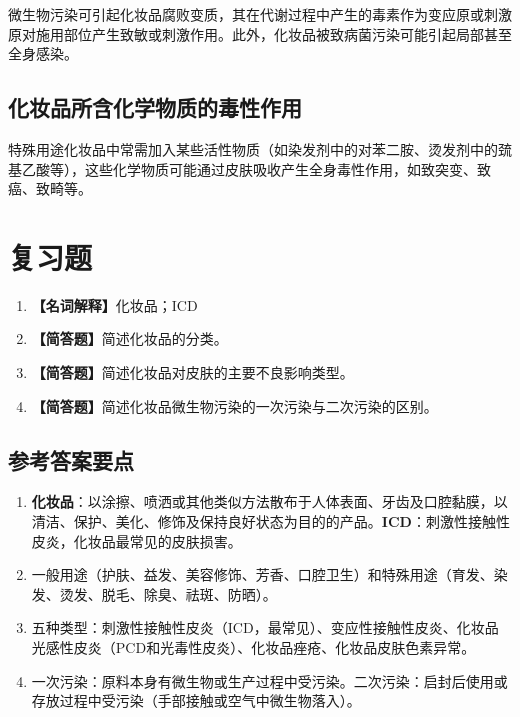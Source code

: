 \documentclass[10pt,a4paper,oneside]{ctexbook}
\begin{document}
微生物污染可引起化妆品腐败变质，其在代谢过程中产生的毒素作为变应原或刺激原对施用部位产生致敏或刺激作用。此外，化妆品被致病菌污染可能引起局部甚至全身感染。

\subsection{化妆品所含化学物质的毒性作用}

特殊用途化妆品中常需加入某些活性物质（如染发剂中的对苯二胺、烫发剂中的巯基乙酸等），这些化学物质可能通过皮肤吸收产生全身毒性作用，如致突变、致癌、致畸等。

\section{复习题}

\begin{enumerate}[leftmargin=*, itemsep=8pt]
    \item \textbf{【名词解释】}化妆品；ICD
    \item \textbf{【简答题】}简述化妆品的分类。
    \item \textbf{【简答题】}简述化妆品对皮肤的主要不良影响类型。
    \item \textbf{【简答题】}简述化妆品微生物污染的一次污染与二次污染的区别。
\end{enumerate}

\subsection*{参考答案要点}

\begin{enumerate}[leftmargin=*, itemsep=5pt]
    \item \textbf{化妆品}：以涂擦、喷洒或其他类似方法散布于人体表面、牙齿及口腔黏膜，以清洁、保护、美化、修饰及保持良好状态为目的的产品。\textbf{ICD}：刺激性接触性皮炎，化妆品最常见的皮肤损害。
    \item 一般用途（护肤、益发、美容修饰、芳香、口腔卫生）和特殊用途（育发、染发、烫发、脱毛、除臭、祛斑、防晒）。
    \item 五种类型：刺激性接触性皮炎（ICD，最常见）、变应性接触性皮炎、化妆品光感性皮炎（PCD和光毒性皮炎）、化妆品痤疮、化妆品皮肤色素异常。
    \item 一次污染：原料本身有微生物或生产过程中受污染。二次污染：启封后使用或存放过程中受污染（手部接触或空气中微生物落入）。
\end{enumerate}

\newpage
\end{document}
